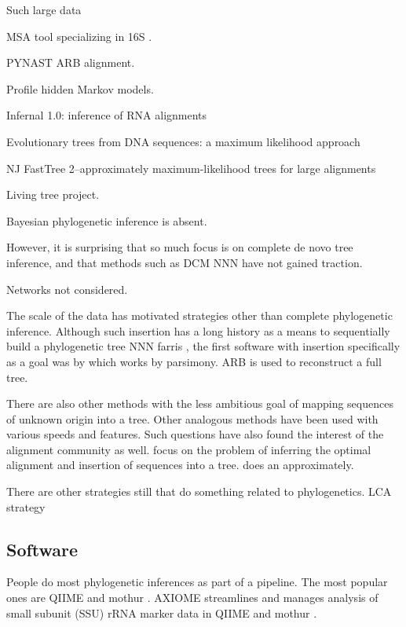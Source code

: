 \documentclass{amsart}
\begin{document}
Such large data

MSA tool specializing in 16S \cite{pruesse2012sina}.

PYNAST
ARB alignment.

\citep{eddy1998profile}
Profile hidden Markov models.

\citep{nawrocki2009infernal}
Infernal 1.0: inference of RNA alignments

\cite{peplies2008standard,yarza2008all}


\citep{felsenstein1981evolutionary}
{Evolutionary trees from DNA sequences: a maximum likelihood approach}

NJ
\citep{price2010fasttree}
{FastTree 2--approximately maximum-likelihood trees for large alignments}

Living tree project.

Bayesian phylogenetic inference is absent.

However, it is surprising that so much focus is on complete de novo tree inference, and that methods such as DCM NNN have not gained traction.

Networks not considered.

The scale of the data has motivated strategies other than complete phylogenetic inference.
Although such insertion has a long history as a means to sequentially build a phylogenetic tree NNN farris
, the first software with insertion specifically as a goal was by \citep{ludwig2004arb} which works by parsimony.
ARB is used to reconstruct a full tree.

There are also other methods with the less ambitious goal of mapping sequences of unknown origin into a tree.
Other analogous methods have been used \citep{wu2008simple,monierEaLargeViruses08,vonMeringEaQuantitative08,stark2010mltreemap,matsen2010pplacer,berger2011performance} with various speeds and features.
Such questions have also found the interest of the alignment community as well.
\citet{berger2011aligning} focus on the problem of inferring the optimal alignment and insertion of sequences into a tree.
\citet{mirarabsepp} does an approximately.

There are other strategies still that do something related to phylogenetics.
\citep{huson2007megan}
LCA strategy


\subsection{Software}

People do most phylogenetic inferences as part of a pipeline.
The most popular ones are QIIME \citep{caporaso2010qiime} and mothur \citep{schloss2009introducing}.
AXIOME streamlines and manages analysis of small subunit (SSU) rRNA marker data in QIIME and mothur \citep{lynch2013axiome}.
\end{document}
